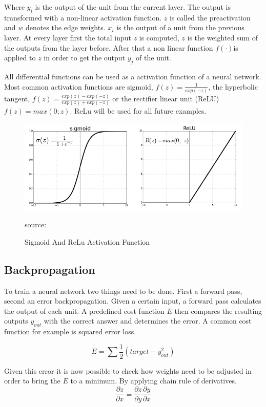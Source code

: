 Where \( y_{i} \) is the output of the unit from the current layer. The output is transformed with a non-linear activation function. \(z\) is called the preactivation and \(w\) denotes the edge weights. \( x_{i} \) is the output of a unit from the previous layer. At every layer first the total input \(z\) is computed, \(z\) is the weighted sum of the outputs from the layer before. After that a non linear function \( f(\cdot) \)is applied to \(z\) in order to get the output \( y_{j} \) of the unit. 

All differential functions can be used as a activation function of a neural network. Most common activation functions are sigmoid,  \(f(z) = \frac{1}{exp(-z)}\), the hyperbolic tangent, \(f(z) = \frac{exp(z)-exp(-z)}{exp(z)+exp(-z)}\) or the rectifier linear unit (ReLU) \(f(z) = max(0; z)\). ReLu will be used for all future examples.


\begin{figure}[H]
	\centering
	\includegraphics[width=0.8\linewidth]{bilder/grundlagen/sigmoid.png}
	\caption{Sigmoid And ReLu Activation Function} source:\cite{Component}
	\label{fig:COMPONENT}
\end{figure}


\subsection{Backpropagation}

To train a neural network two things need to be done. First a forward pass, second an error backpropagation. Given a certain input, a forward pass calculates the output of each unit. A predefined cost function \(E\) then compares the resulting outputs \(y_{out}\) with the correct answer and determines the error. A common cost function for example is 
squared error loss.

\begin{equation}
E=\sum\dfrac{1}{2} (target-y_{out}^2) 
\end{equation}
	
Given this error it is now possible to check how weights need to be adjusted in order to bring the \(E\) to a minimum. By applying chain rule of derivatives. 
\begin{equation}
\frac{\partial z}{\partial x} = \frac{\partial z}{\partial y} \frac{\partial y}{\partial x}
\end{equation}

